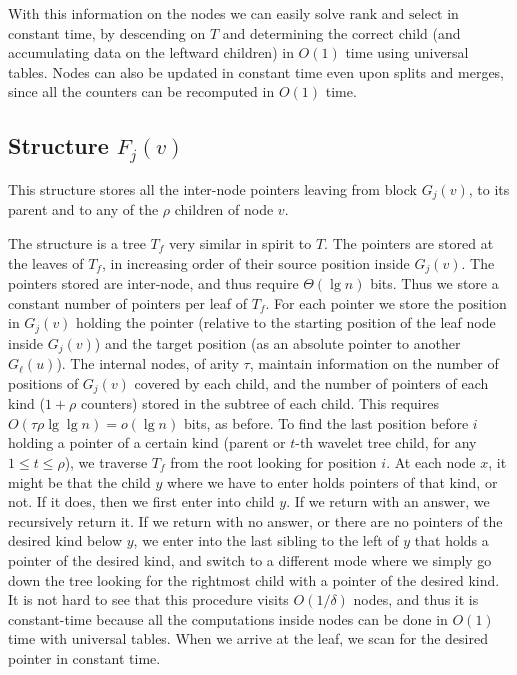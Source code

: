 \documentclass[11pt]{article}
\def\idrm#1{\ensuremath{\mathrm{#1}}}
\newcommand{\ra}{\idrm{rank}}
\newcommand{\sel}{\idrm{select}}
\begin{document}
With this information on the nodes we can easily solve $\ra$ and $\sel$ in
constant time, by descending on $T$ and determining the correct child
(and accumulating data on the leftward children) in $O(1)$ time using
universal tables. Nodes can also be updated in constant time even upon splits
and merges, since all the counters can be recomputed in $O(1)$ time.

\subsection{Structure $F_j(v)$}

This structure stores all the inter-node pointers leaving from 
block $G_j(v)$, to its parent and to any of the $\rho$ children of node $v$.

The structure is a tree $T_f$ very similar in spirit to $T$. The pointers
are stored at the leaves of $T_f$, in increasing order of their source
position inside $G_j(v)$.
The pointers stored are inter-node, and
thus require $\Theta(\lg n)$ bits. Thus we store a constant number of pointers 
per leaf of $T_f$. For each pointer we store the position in $G_j(v)$ holding the pointer
(relative to the starting position of the leaf node inside $G_j(v)$) 
and the target position (as an absolute pointer to another $G_\ell(u)$). 
The internal nodes, of arity $\tau$, maintain 
information on the number of positions of $G_j(v)$ covered by each child,
and the number of pointers of each kind ($1+\rho$ counters) stored in the 
subtree of each child. This requires $O(\tau\rho\lg\lg n) = o(\lg n)$ bits, as
before. To find the last position before $i$ holding a pointer of a certain
kind (parent or $t$-th wavelet tree child, for any $1\le t\le\rho$), we 
traverse $T_f$ from the root looking for position $i$. At each node $x$, it 
might be that the child $y$ where we have to enter holds pointers of that kind,
or not. If it does, then we first enter into child $y$. If we return with an 
answer, we recursively return it. If we return with no answer, or there are
no pointers of the desired kind below $y$, we enter into the last sibling to 
the left of $y$ that holds a pointer of the desired kind, and switch to a 
different mode where we simply go down the tree looking for the rightmost 
child with a pointer of the desired kind. It is not hard to see that this 
procedure visits $O(1/\delta)$ nodes, and thus it is constant-time because all 
the computations inside nodes can be done in $O(1)$ time with universal tables.
When we arrive at the leaf, 
we scan for the desired pointer in constant time.
\end{document}
